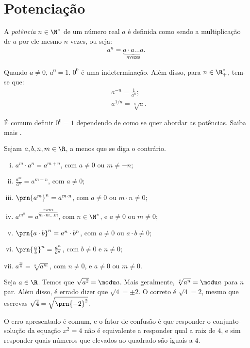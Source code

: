 \section{Potenciação}

\begin{definition}
A \emph{potência} $n \in \N^*$ de um número real $a$ é definida
como sendo a multiplicação de $a$ por ele mesmo $n$ vezes, ou seja:
%
\begin{align*}
a^n = \underbrace{a \cdot a  \dots  a}_{n \text{
vezes}}.
\end{align*}
\end{definition}

\begin{definition}
Quando $a \neq 0$, $a^0 = 1$. $0^0$ é uma indeterminação. Além disso, para $n \in \R^*_+$, tem-se que: 
\begin{align*}
&a^{-n} = \frac{1}{a^n}; \\
&a^{1/n} = \sqrt[n] a.
\end{align*}
\end{definition}

É comum definir $0^0 =1$ dependendo de como se quer abordar as potências. Saiba mais .

\begin{proposition}[Propriedades]
Sejam $a, b, n, m \in \R$, a menos que se diga o contrário.
\begin{enumerate}[i.]
  \item $a^m \cdot a^n = a^{m+n}$, com $a \ne 0$ ou $m \ne -n$;
  \item $\frac {a^m}{a^n} = a^{m-n}$, com $a \ne 0$;
  \item $\prn{a^m}^n = a^{m\cdot n}$, com $a \ne 0$ ou $m\cdot n \ne 0$;
  \item $a^{m^n} = a^{\overbrace{m \cdot m  \dots  m}^{n \text{
  vezes}}}$, com $n \in \N^*$, e $a \ne 0$ ou $m \ne 0$;
  \item $\prn{a \cdot b }^n= a^n \cdot b^n$, com $a \ne 0$ ou $a \cdot b \ne 0$;
  \item $\prn{\frac a b }^n = \frac {a^n} {b^n}$, com $b \ne 0$ e $n \ne 0$; 
  \item $a^{\frac m n} = \sqrt[n]{a^m}$, com $n \neq 0$, e $a \ne 0$ ou $m \ne 0$.
\end{enumerate}
\end{proposition}

\begin{remark}
Seja $a \in \R$. Temos que $\sqrt{a^2} = \modu a$. Mais geralmente, $\sqrt[n] {a^n} = \modu a$ para $n$ par. Além disso, é errado dizer que $\sqrt 4 = \pm 2$. O correto é $\sqrt 4 = 2$, mesmo que escrevas $\sqrt 4 = \sqrt{\prn {-2}^2}$. 

O erro apresentado é comum, e o fator de confusão é que responder o conjunto-solução da equação $x^2=4$ não é equivalente a responder qual a raiz de $4$, e sim responder quais números que elevados ao quadrado são iguais a $4$.
\end{remark}

